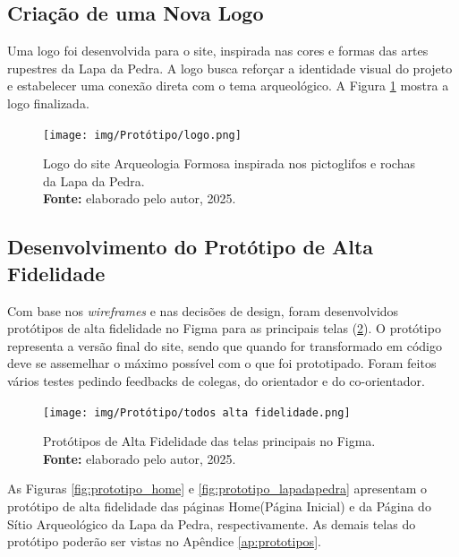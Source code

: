 \subsection{Criação de uma Nova Logo}
Uma logo foi desenvolvida para o site, inspirada nas cores e formas das artes rupestres da Lapa da Pedra. A logo busca reforçar a identidade visual do projeto e estabelecer uma conexão direta com o tema arqueológico. A Figura \ref{fig:logo_arqueologia_formosa} mostra a logo finalizada.
\begin{figure}[H]
    \centering
    \texttt{[image: img/Protótipo/logo.png]}
    \caption{ Logo do site Arqueologia Formosa inspirada nos pictoglifos e rochas da Lapa da Pedra. \\
        \textbf{Fonte:} elaborado pelo autor, 2025.}
    \label{fig:logo_arqueologia_formosa}
\end{figure}


\subsection{Desenvolvimento do Protótipo de Alta Fidelidade}
Com base nos \textit{wireframes} e nas decisões de design, foram desenvolvidos protótipos de alta fidelidade no Figma para as principais telas (\ref{fig:prototipos_alta_fidelidade}). O protótipo representa a versão final do site, sendo que quando for transformado em código deve se assemelhar o máximo possível com o que foi prototipado. Foram feitos vários testes pedindo feedbacks de colegas, do orientador e do co-orientador. 

\begin{figure}[H]
    \centering
    \texttt{[image: img/Protótipo/todos alta fidelidade.png]}
    \caption{ Protótipos de Alta Fidelidade das telas principais no Figma. \\
        \textbf{Fonte:} elaborado pelo autor, 2025.}
    \label{fig:prototipos_alta_fidelidade}
\end{figure}

As Figuras \ref{fig:prototipo_home} e \ref{fig:prototipo_lapadapedra} apresentam o protótipo de alta fidelidade das páginas Home(Página Inicial) e da Página do Sítio Arqueológico da Lapa da Pedra, respectivamente. As demais telas do protótipo poderão ser vistas no Apêndice \ref{ap:prototipos}.

